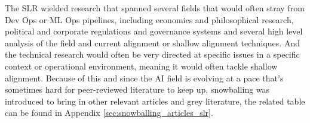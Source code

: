 \begin{toreview}
	The SLR wielded research that spanned several fields that would often stray from Dev Ops or ML Ops pipelines, including economics and philosophical research, political and corporate regulations and governance systems and several high level analysis of the field and current alignment or shallow alignment techniques. And the technical research would often be very directed at specific issues in a specific context or operational environment, meaning it would often tackle shallow alignment\cite{milliere_normative_2025, mcintosh_inadequacy_2024}. Because of this and since the AI field is evolving at a pace that's sometimes hard for peer-reviewed literature to keep up, snowballing was introduced to bring in other relevant articles and grey literature\cite{wohlin_guidelines_2014}, the related table can be found in Appendix \ref{sec:snowballing_articles_slr}.


\end{toreview}
